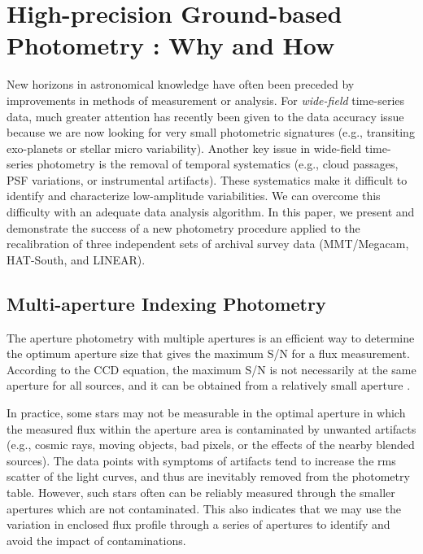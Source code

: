 \section{High-precision Ground-based Photometry : Why and How}
New horizons in astronomical knowledge have often been preceded by improvements in methods of measurement or analysis.  For {\itshape wide-field} time-series data, much greater attention has recently been given to the data accuracy issue because we are now looking for very small photometric signatures (e.g., transiting exo-planets or stellar micro variability).  Another key issue in wide-field time-series photometry is the removal of temporal systematics (e.g., cloud passages, PSF variations, or instrumental artifacts).  These systematics make it difficult to identify and characterize low-amplitude variabilities.  We can overcome this difficulty with an adequate data analysis algorithm.  In this paper, we present and demonstrate the success of a new photometry procedure applied to the recalibration of three independent sets of archival survey data (MMT/Megacam, HAT-South, and LINEAR).

\subsection{Multi-aperture Indexing Photometry}
The aperture photometry with multiple apertures is an efficient way to determine the optimum aperture size that gives the maximum S/N for a flux measurement.  According to the CCD equation, the maximum S/N is not necessarily at the same aperture for all sources, and it can be obtained from a relatively small aperture \citep{how89}.

In practice, some stars may not be measurable in the optimal aperture in which the measured flux within the aperture area is contaminated by unwanted artifacts (e.g., cosmic rays, moving objects, bad pixels, or the effects of the nearby blended sources).  The data points with symptoms of artifacts tend to increase the rms scatter of the light curves, and thus are inevitably removed from the photometry table.  However, such stars often can be reliably measured through the smaller apertures which are not contaminated.  This also indicates that we may use the variation in enclosed flux profile through a series of apertures to identify and avoid the impact of contaminations.

